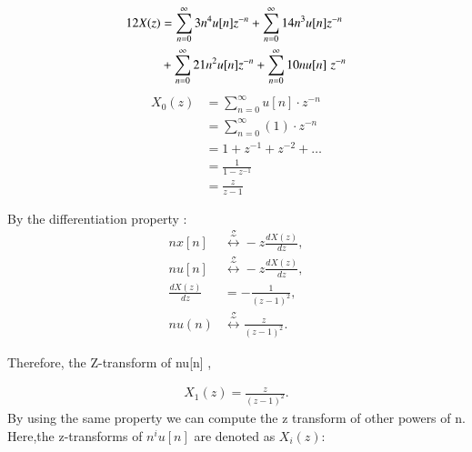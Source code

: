 \documentclass[journal,12pt,twocolumn]{IEEEtran}
\theoremstyle{remark}
\begin{document}
\begin{enumerate}[label=\alph*)]
\begin{equation}
\end{equation}
\begin{align}
    12X(z) &= \sum_{n=0}^\infty 3n^4u[n]z^{-n} +  \sum_{n=0}^\infty 14n^3u[n]z^{-n} \\ &+  \sum_{n=0}^\infty 21n^2u[n] z^{-n} +\sum_{n=0}^\infty 10nu[n]\hspace{3pt} z^{-n}\notag
\end{align}
    \begin{align*}
X_0(z) &= \sum_{n=0}^{\infty} u[n]\cdot z^{-n} \\
     &= \sum_{n=0}^{\infty} (1) \cdot z^{-n} \\
     &= 1 + z^{-1} + z^{-2} + \ldots \\
     &= \frac{1}{1 - z^{-1}} \\
     &= \frac{z}{z - 1}
\end{align*}

By the differentiation property :
\begin{align*}
n x[n] &\stackrel{\mathcal{Z}}{\longleftrightarrow} -z \frac{dX(z)}{dz}, \\
n u[n] &\stackrel{\mathcal{Z}}{\longleftrightarrow} -z \frac{dX(z)}{dz}, \\
\frac{dX(z)}{dz} &= -\frac{1}{(z - 1)^2}, \\
n u(n) &\stackrel{\mathcal{Z}}{\longleftrightarrow} \frac{z}{(z - 1)^2}.
\end{align*}

Therefore, the Z-transform of n\cdot u[n] ,

\begin{align}
    X_1(z) = \frac{z}{(z - 1)^2}.
\end{align}
By using the same property we can compute the z
transform of other powers of n. Here,the z-transforms of \(n^i\)\cdot \(u[n]\) are denoted as \(X_i(z)\):


\end{enumerate}
\end{document}
